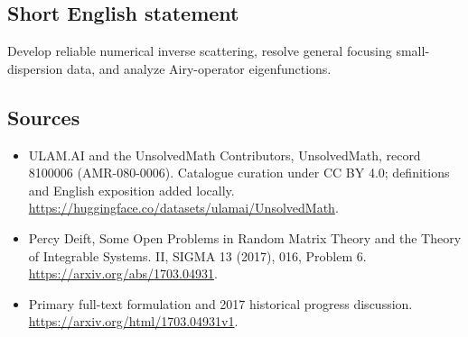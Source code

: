 \documentclass[11pt]{article}
\begin{document}
\subsection{Short English statement}
Develop reliable numerical inverse scattering, resolve general focusing small-dispersion data, and analyze Airy-operator eigenfunctions.
\subsection{Sources}
\begin{itemize}
\item[\hypertarget{source:8100006:1}{S1}] ULAM.AI and the UnsolvedMath Contributors, UnsolvedMath, record 8100006 (AMR-080-0006). Catalogue curation under CC BY 4.0; definitions and English exposition added locally.
\url{https://huggingface.co/datasets/ulamai/UnsolvedMath}.
\item[\hypertarget{source:8100006:2}{S2}] Percy Deift, Some Open Problems in Random Matrix Theory and the Theory of Integrable Systems. II, SIGMA 13 (2017), 016, Problem 6.
\url{https://arxiv.org/abs/1703.04931}.
\item[\hypertarget{source:8100006:3}{S3}] Primary full-text formulation and 2017 historical progress discussion.
\url{https://arxiv.org/html/1703.04931v1}.
\end{itemize}
\label{end:8100006}
\end{document}
